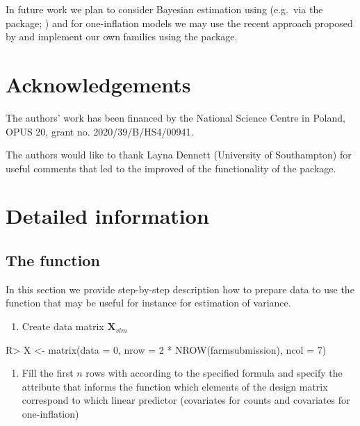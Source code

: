 \documentclass[
]{jss}
\providecommand{\tightlist}{%
  \setlength{\itemsep}{0pt}\setlength{\parskip}{0pt}}
\newcommand{\1}{\mathcal{I}} \newcommand{\bZero}{\boldsymbol{0}}
\begin{document}
In future work we plan to consider Bayesian estimation using
 (e.g.~via the  package;
\cite{carpenter2017stan, brms}) and for one-inflation models we may use
the recent approach proposed by \cite{tuoto2022bayesian} and implement
our own families using the  package.

\section{Acknowledgements}\label{Acknowledgements}

The authors' work has been financed by the National Science Centre in
Poland, OPUS 20, grant no. 2020/39/B/HS4/00941.

The authors would like to thank Layna Dennett (University of
Southampton) for useful comments that led to the improved of the
functionality of the package.

\appendix

\section{Detailed information}\label{sec-details}

\subsection[The estimatePopsizeFit function]{The
 function}\label{sec-estimatePopsizeFit}

In this section we provide step-by-step description how to prepare data
to use the  function that may be useful for
instance for estimation of variance.

\begin{enumerate}
\def\labelenumi{\arabic{enumi}.}
\tightlist
\item
  Create data matrix \(\boldsymbol{X}_{vlm}\)
\end{enumerate}

\begin{CodeChunk}
\begin{CodeInput}
R> X <- matrix(data = 0, nrow = 2 * NROW(farmsubmission), ncol = 7)
\end{CodeInput}
\end{CodeChunk}

\begin{enumerate}
\def\labelenumi{\arabic{enumi}.}
\setcounter{enumi}{1}
\tightlist
\item
  Fill the first \(n\) rows with  according to the
  specified formula and specify the attribute  that
  informs the function which elements of the design matrix correspond to
  which linear predictor (covariates for counts and covariates for
  one-inflation)
\end{enumerate}
\end{document}
